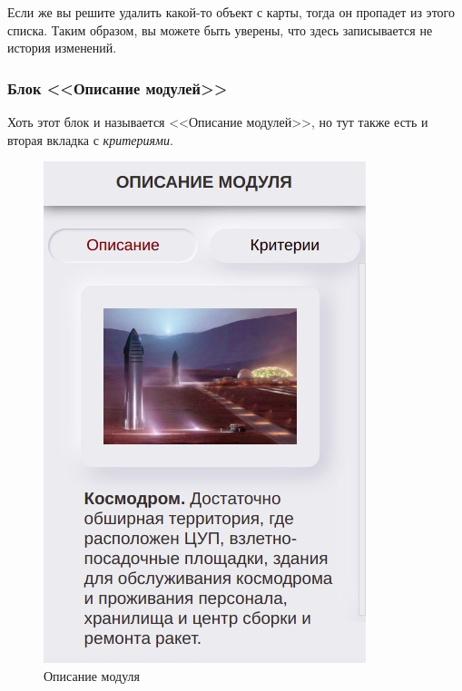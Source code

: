 Если же вы решите удалить какой-то объект с карты, тогда он пропадет из этого списка. Таким образом, вы можете быть уверены, что здесь записывается не история изменений.



\subsubsection{Блок <<Описание модулей>>}

Хоть этот блок и называется <<Описание модулей>>, но тут также есть и вторая вкладка с \textit{критериями}.

\begin{figure}[h!]
	\begin{minipage}{.48\textwidth}
		\centering
		\includegraphics[width=.7\linewidth]{./img/module_description-1}
		\caption{Описание модуля}\label{fig:module_description-1}
	\end{minipage}
	\begin{minipage}{.48\textwidth}
		\centering

\end{minipage}
\end{figure}
